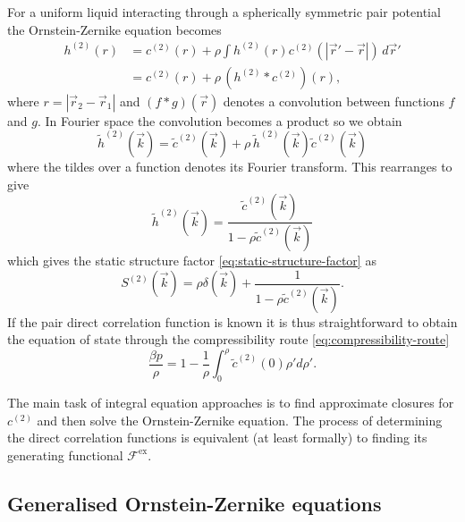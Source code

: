 For a uniform liquid interacting through a spherically symmetric pair potential the Ornstein-Zernike equation becomes
\begin{equation}\label{eq:ornstein-zernike-spherical}
  \begin{split}
    h^{(2)}(r)
    &=
    c^{(2)}(r) +
    \rho
    \int
    h^{(2)}(r)
    c^{(2)}(|\vec{r}' - \vec{r}|)
    \, d\vec{r}'
    \\ &=
    c^{(2)}(r) + \rho \, (h^{(2)} * c^{(2)})(r),
  \end{split}
\end{equation}
where $r = |\vec{r}_2 - \vec{r}_1|$ and $(f*g)(\vec{r})$ denotes a convolution between functions $f$ and $g$.
In Fourier space the convolution becomes a product so we obtain
\begin{equation*}
  \tilde{h}^{(2)}(\vec{k})
  =
  \tilde{c}^{(2)}(\vec{k}) +
  \rho \, \tilde{h}^{(2)}(\vec{k}) \tilde{c}^{(2)}(\vec{k})
\end{equation*}
where the tildes over a function denotes its Fourier transform.
This rearranges to give
\begin{equation*}
  \tilde{h}^{(2)}(\vec{k})
  =
  \frac{\tilde{c}^{(2)}(\vec{k})}{1 - \rho \tilde{c}^{(2)}(\vec{k})}
\end{equation*}
which gives the static structure factor \eqref{eq:static-structure-factor} as
\begin{equation*}
  S^{(2)}(\vec{k})
  =
  \rho \delta(\vec{k}) +
  \frac{1}{1 - \rho \tilde{c}^{(2)}(\vec{k})}.
\end{equation*}
If the pair direct correlation function is known it is thus straightforward to obtain the equation of state through the compressibility route \eqref{eq:compressibility-route}
\begin{equation*}
  \frac{\beta p}{\rho}
  =
  1 - \frac{1}{\rho} \int_0^\rho \tilde{c}^{(2)}(0) \rho' d\rho'.
\end{equation*}

The main task of integral equation approaches is to find approximate closures for $c^{(2)}$ and then solve the Ornstein-Zernike equation.
The process of determining the direct correlation functions is equivalent (at least formally) to finding its generating functional $\mathcal{F}^\mathrm{ex}$.

\subsection{Generalised Ornstein-Zernike equations}

